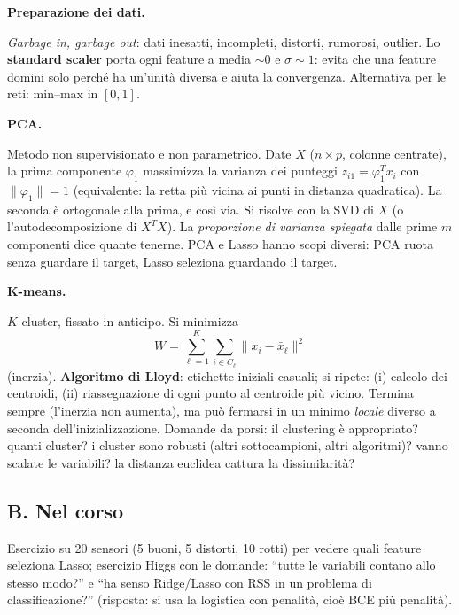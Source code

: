 \documentclass[11pt,a4paper]{article}
\newcommand{\dom}[1]{\par\smallskip\noindent\textbf{#1}\par\nopagebreak}
\begin{document}
\dom{Preparazione dei dati.} \emph{Garbage in, garbage out}: dati inesatti, incompleti, distorti, rumorosi, outlier. Lo \textbf{standard scaler} porta ogni feature a media $\sim0$ e $\sigma\sim1$: evita che una feature domini solo perch\'e ha un'unit\`a diversa e aiuta la convergenza. Alternativa per le reti: min--max in $[0,1]$.

\dom{PCA.} Metodo non supervisionato e non parametrico. Date $X$ ($n\times p$, colonne centrate), la prima componente $\varphi_1$ massimizza la varianza dei punteggi $z_{i1}=\varphi_1^Tx_i$ con $\|\varphi_1\|=1$ (equivalente: la retta pi\`u vicina ai punti in distanza quadratica). La seconda \`e ortogonale alla prima, e cos\`i via. Si risolve con la SVD di $X$ (o l'autodecomposizione di $X^TX$). La \emph{proporzione di varianza spiegata} dalle prime $m$ componenti dice quante tenerne. PCA e Lasso hanno scopi diversi: PCA ruota senza guardare il target, Lasso seleziona guardando il target.

\dom{K-means.} $K$ cluster, fissato in anticipo. Si minimizza
\[
W=\sum_{\ell=1}^{K}\sum_{i\in C_\ell}\|x_i-\bar x_\ell\|^2
\]
(inerzia). \textbf{Algoritmo di Lloyd}: etichette iniziali casuali; si ripete: (i) calcolo dei centroidi, (ii) riassegnazione di ogni punto al centroide pi\`u vicino. Termina sempre (l'inerzia non aumenta), ma pu\`o fermarsi in un minimo \emph{locale} diverso a seconda dell'inizializzazione. Domande da porsi: il clustering \`e appropriato? quanti cluster? i cluster sono robusti (altri sottocampioni, altri algoritmi)? vanno scalate le variabili? la distanza euclidea cattura la dissimilarit\`a?

\subsection*{B. Nel corso}
Esercizio su 20 sensori (5 buoni, 5 distorti, 10 rotti) per vedere quali feature seleziona Lasso; esercizio Higgs con le domande: ``tutte le variabili contano allo stesso modo?'' e ``ha senso Ridge/Lasso con RSS in un problema di classificazione?'' (risposta: si usa la logistica con penalit\`a, cio\`e BCE pi\`u penalit\`a).
\end{document}
